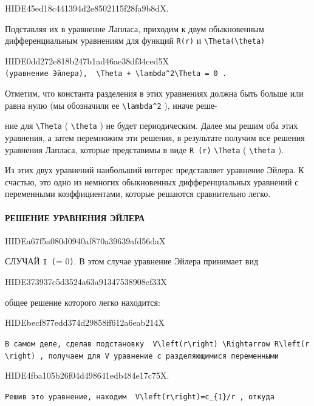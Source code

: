 \documentclass[
  ukrainian,
]{article}
\begin{document}
HIDE45ed18c441394d2e8502115f28fa9b8dX.

Подставляя их в уравнение Лапласа, приходим к двум обыкновенным
дифференциальным уравнениям для функций \texttt{R(r)} и
\texttt{\textbackslash{}Theta(\textbackslash{}theta)}

HIDE0dd272e818b247b1ad46ae38df34ced5X
\texttt{(уравнение\ Эйлера),\ \ \textquotesingle{}\textbackslash{}Theta\textquotesingle{}\textquotesingle{}\ +\ \textbackslash{}lambda\^{}2\textbackslash{}Theta\ =\ 0\textquotesingle{}\ .}

Отметим, что константа разделения в этих уравнениях должна быть больше
или равна нулю (мы обозначили ее \texttt{\textbackslash{}lambda\^{}2} ),
иначе реше-

ние для \texttt{\textbackslash{}Theta} ( \texttt{\textbackslash{}theta}
) не будет периодическим. Далее мы решим оба этих уравнения, а затем
перемножим эти решения, в результате получим все решения уравнения
Лапласа, которые представимы в виде \texttt{R\ (r)}
\texttt{\textbackslash{}Theta} ( \texttt{\textbackslash{}theta} ).

Из этих двух уравнений наибольший интерес представляет уравнение Эйлера.
К счастью, это одно из немногих обыкновенных дифференциальных уравнений
с переменными коэффициентами, которые решаются сравнительно легко.

\paragraph{РЕШЕНИЕ УРАВНЕНИЯ
ЭЙЛЕРА}\label{ux440ux435ux448ux435ux43dux438ux435-ux443ux440ux430ux432ux43dux435ux43dux438ux44f-ux44dux439ux43bux435ux440ux430}

HIDEa67f5a080d0940af870a39639afd56daX

СЛУЧАЙ \texttt{I\ (}\lambda = 0\texttt{)}. В этом случае уравнение
Эйлера принимает вид

HIDE373937c5d3524a63a91347538908ef33X

общее решение которого легко находится:

HIDEbecf877edd374d29858ff612a6eab214X

\texttt{В\ самом\ деле,\ сделав\ подстановку\ \ \textquotesingle{}V\textbackslash{}left(r\textbackslash{}right)\ \textbackslash{}Rightarrow\ R\textquotesingle{}\textbackslash{}left(r\textbackslash{}right)\textquotesingle{}\ ,\ получаем\ для\ V\ уравнение\ с\ разделяющимися\ переменными}

HIDE4fba105b26f04d498641edb484e17c75X.

\texttt{Решив\ это\ уравнение,\ находим\ \ \textquotesingle{}V\textbackslash{}left(r\textbackslash{}right)=c\_\{1\}/r\textquotesingle{}\ ,\ откуда}
\end{document}
